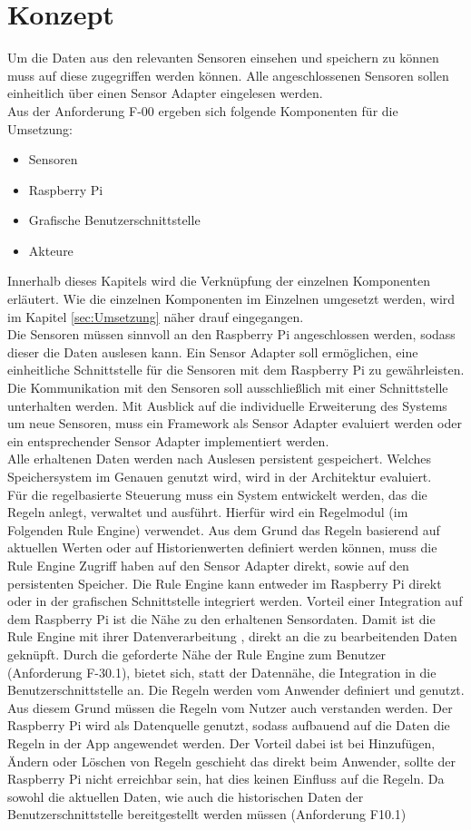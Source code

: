 \section{Konzept}
Um die Daten aus den relevanten Sensoren einsehen und speichern zu können muss auf diese zugegriffen werden können. Alle angeschlossenen Sensoren sollen einheitlich über einen Sensor Adapter eingelesen werden.\\
Aus der Anforderung F-00 ergeben sich folgende Komponenten für die Umsetzung:
\begin{itemize}
\item Sensoren
\item Raspberry Pi
\item Grafische Benutzerschnittstelle
\item Akteure
\end{itemize}
Innerhalb dieses Kapitels wird die Verknüpfung der einzelnen Komponenten erläutert. Wie die einzelnen Komponenten im Einzelnen umgesetzt werden, wird im Kapitel \ref{sec:Umsetzung} näher drauf eingegangen.\\
Die Sensoren müssen sinnvoll an den Raspberry Pi angeschlossen werden, sodass dieser die Daten auslesen kann. Ein Sensor Adapter soll ermöglichen, eine einheitliche Schnittstelle für die Sensoren mit dem Raspberry Pi zu gewährleisten. Die Kommunikation mit den Sensoren soll ausschließlich mit einer Schnittstelle unterhalten werden. Mit Ausblick auf die individuelle Erweiterung des Systems um neue Sensoren, muss ein Framework als Sensor Adapter evaluiert werden oder ein entsprechender Sensor Adapter implementiert werden.\\
Alle erhaltenen Daten werden nach Auslesen persistent gespeichert. Welches Speichersystem im Genauen genutzt wird, wird in der Architektur evaluiert.\\
Für die regelbasierte Steuerung muss ein System entwickelt werden, das die Regeln anlegt, verwaltet und ausführt. Hierfür wird ein Regelmodul (im Folgenden Rule Engine) verwendet. Aus dem Grund das Regeln basierend auf aktuellen Werten oder auf Historienwerten definiert werden können, muss die Rule Engine Zugriff haben auf den Sensor Adapter direkt, sowie auf den persistenten Speicher. Die Rule Engine kann entweder im Raspberry Pi direkt oder in der grafischen Schnittstelle integriert werden. Vorteil einer Integration auf dem Raspberry Pi ist die Nähe zu den erhaltenen Sensordaten. Damit ist die Rule Engine mit ihrer Datenverarbeitung \cite{Hayes-Roth:1985:RS:4284.4286}, direkt an die zu bearbeitenden Daten geknüpft. Durch die geforderte Nähe der Rule Engine zum Benutzer (Anforderung F-30.1), bietet sich, statt der Datennähe, die Integration in die Benutzerschnittstelle an. Die Regeln werden vom Anwender definiert und genutzt. Aus diesem Grund müssen die Regeln vom Nutzer auch verstanden werden. Der Raspberry Pi wird als Datenquelle genutzt, sodass aufbauend auf die Daten die Regeln in der App angewendet werden. Der Vorteil dabei ist bei Hinzufügen, Ändern oder Löschen von Regeln geschieht das direkt beim Anwender, sollte der Raspberry Pi nicht erreichbar sein, hat dies keinen Einfluss auf die Regeln. Da sowohl die aktuellen Daten, wie auch die historischen Daten der Benutzerschnittstelle bereitgestellt werden müssen (Anforderung F10.1)

